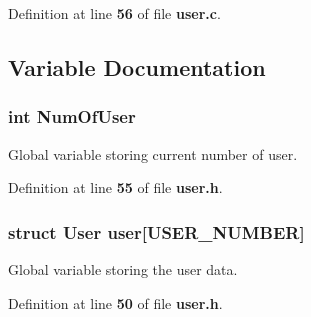 Definition at line {\bf 56} of file {\bf user.\+c}.



\subsection{Variable Documentation}
\subsubsection[{Num\+Of\+User}]{\setlength{\rightskip}{0pt plus 5cm}int Num\+Of\+User}\label{user_8h_aac90b1eed59a0a4b55ab8735c1561e6a}
Global variable storing current number of user. 

Definition at line {\bf 55} of file {\bf user.\+h}.

\subsubsection[{user}]{\setlength{\rightskip}{0pt plus 5cm}struct {\bf User} user[{\bf U\+S\+E\+R\+\_\+\+N\+U\+M\+B\+E\+R}]}\label{user_8h_ab69c72da1b6bf385854fb5213ae53b36}
Global variable storing the user data. 

Definition at line {\bf 50} of file {\bf user.\+h}.

